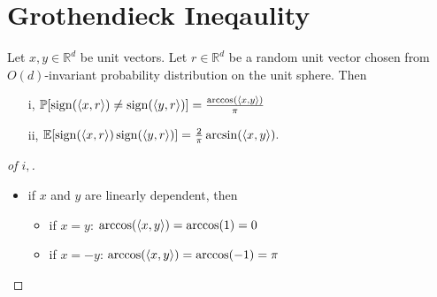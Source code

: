\section{Grothendieck Ineqaulity}

\begin{frame}
	\begin{lemma}\label{lem:G_id}
	Let $x,y\in\mathbb{R}^d$ be unit vectors. Let $r\in\mathbb{R}^d$ be a random unit vector chosen from $O(d)$-invariant probability distribution on the unit sphere. Then
	\begin{enumerate}
		\item[i,] $\mathbb{P}[\operatorname{sign}(\langle{x},{r}\rangle)\neq\operatorname{sign}(\langle{y},{r}\rangle)]=\frac{\arccos(\langle{x},{y}\rangle)}{\pi}$
		\item[ii,] $\mathbb{E}[\operatorname{sign}(\langle{x},{r}\rangle)\operatorname{sign}(\langle{y},{r}\rangle)]=\frac{2}{\pi}\arcsin(\langle{x},{y}\rangle).$
	\end{enumerate}
\end{lemma}
\begin{proof}[of $i,$]
	\begin{itemize}
		\item<1-> if $x$ and $y$ are linearly dependent, then
		\begin{itemize}
			\item<2-> if $x=y$: $\arccos(\langle{x},{y}\rangle)=\arccos(1) = 0$
			\item<3-> if $x=-y$: $\arccos(\langle{x},{y}\rangle)=\arccos(-1) = \pi$
		\end{itemize}
	\end{itemize}
\end{proof}
\end{frame}